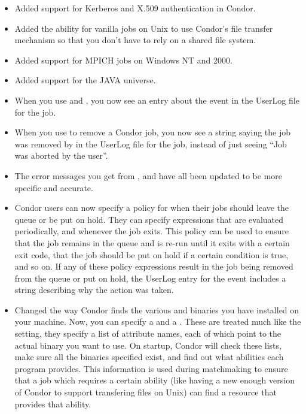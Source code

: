 \begin{itemize}

\item Added support for Kerberos and X.509 authentication in Condor.  

\item Added the ability for vanilla jobs on Unix to use Condor's file
transfer mechanism so that you don't have to rely on a shared file
system.  

\item Added support for MPICH jobs on Windows NT and 2000.

\item Added support for the JAVA universe.

\item When you use  and , you now see an
entry about the event in the UserLog file for the job.

\item When you use  to remove a Condor job, you now see a
string saying the job was removed by  in the UserLog file
for the job, instead of just seeing ``Job was aborted by the user''.

\item The error messages you get from ,  and
 have all been updated to be more specific and
accurate. 

\item Condor users can now specify a policy for when their jobs should
leave the queue or be put on hold.
They can specify expressions that are evaluated periodically, and
whenever the job exits.
This policy can be used to ensure that the job remains in the queue
and is re-run until it exits with a certain exit code, that the job
should be put on hold if a certain condition is true, and so on. 
If any of these policy expressions result in the job being removed
from the queue or put on hold, the UserLog entry for the event
includes a string describing why the action was taken.

\item Changed the way Condor finds the various  and
 binaries you have installed on your machine.
Now, you can specify a  and a
.
These are treated much like the  setting, they
specify a list of attribute names, each of which point to the actual
binary you want to use.
On startup, Condor will check these lists, make sure all the binaries
specified exist, and find out what abilities each program provides.
This information is used during matchmaking to ensure that a job which
requires a certain ability (like having a new enough version of Condor
to support transfering files on Unix) can find a resource that
provides that ability.


\end{itemize}
